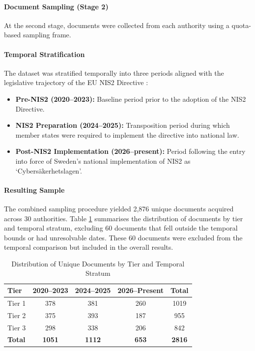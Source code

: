 \documentclass[conference]{IEEEtran}
\begin{document}
\paragraph{Document Sampling (Stage 2)}
At the second stage, documents were collected from each authority using a quota-based sampling frame. 

\paragraph{Temporal Stratification}
The dataset was stratified temporally into three periods aligned with the legislative trajectory of the EU NIS2 Directive \cite{eu-nis2}:
\begin{itemize}
    \item \textbf{Pre-NIS2 (2020–2023):} Baseline period prior to the adoption of the NIS2 Directive.
    \item \textbf{NIS2 Preparation (2024–2025):} Transposition period during which member states were required to implement the directive into national law.
    \item \textbf{Post-NIS2 Implementation (2026–present):} Period following the entry into force of Sweden's national implementation of NIS2 as `Cybersäkerhetslagen'.
\end{itemize}

\paragraph{Resulting Sample}
The combined sampling procedure yielded 2,876 unique documents acquired across 30 authorities. Table \ref{tab:sample_distribution} summarises the distribution of documents by tier and temporal stratum, excluding 60 documents that fell outside the temporal bounds or had unresolvable dates. These 60 documents were excluded from the temporal comparison but included in the overall results. 

\begin{table}[htbp]
\centering
\caption{Distribution of Unique Documents by Tier and Temporal Stratum}
\label{tab:sample_distribution}
\begin{tabular}{|l|c|c|c|c|}
\hline
\textbf{Tier} & \textbf{2020–2023} & \textbf{2024–2025} & \textbf{2026–Present} & \textbf{Total} \\
\hline
Tier 1 & 378 & 381 & 260 & 1019 \\
Tier 2 & 375 & 393 & 187 & 955 \\
Tier 3 & 298 & 338 & 206 & 842 \\
\hline
\textbf{Total} & \textbf{1051} & \textbf{1112} & \textbf{653} & \textbf{2816} \\
\hline
\end{tabular}
\end{table}
\end{document}
